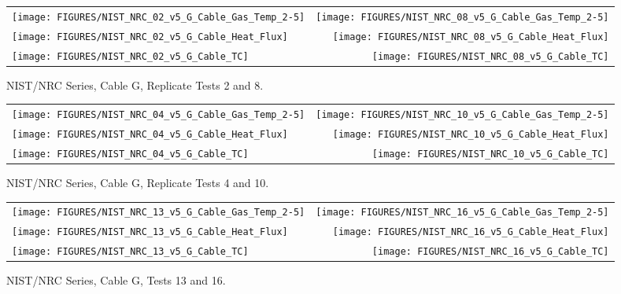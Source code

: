 \begin{figure}[h]
\begin{tabular*}{\textwidth}{l@{\extracolsep{\fill}}r}
\texttt{[image: FIGURES/NIST\_NRC\_02\_v5\_G\_Cable\_Gas\_Temp\_2-5]} &
\texttt{[image: FIGURES/NIST\_NRC\_08\_v5\_G\_Cable\_Gas\_Temp\_2-5]} \\
\texttt{[image: FIGURES/NIST\_NRC\_02\_v5\_G\_Cable\_Heat\_Flux]} &
\texttt{[image: FIGURES/NIST\_NRC\_08\_v5\_G\_Cable\_Heat\_Flux]} \\
\texttt{[image: FIGURES/NIST\_NRC\_02\_v5\_G\_Cable\_TC]} &
\texttt{[image: FIGURES/NIST\_NRC\_08\_v5\_G\_Cable\_TC]}
\end{tabular*}
\caption{NIST/NRC Series, Cable G, Replicate Tests 2 and 8.}
\label{NIST_NRC_G_2_and_8}
\end{figure}

\begin{figure}[h]
\begin{tabular*}{\textwidth}{l@{\extracolsep{\fill}}r}
\texttt{[image: FIGURES/NIST\_NRC\_04\_v5\_G\_Cable\_Gas\_Temp\_2-5]} &
\texttt{[image: FIGURES/NIST\_NRC\_10\_v5\_G\_Cable\_Gas\_Temp\_2-5]} \\
\texttt{[image: FIGURES/NIST\_NRC\_04\_v5\_G\_Cable\_Heat\_Flux]} &
\texttt{[image: FIGURES/NIST\_NRC\_10\_v5\_G\_Cable\_Heat\_Flux]} \\
\texttt{[image: FIGURES/NIST\_NRC\_04\_v5\_G\_Cable\_TC]} &
\texttt{[image: FIGURES/NIST\_NRC\_10\_v5\_G\_Cable\_TC]}
\end{tabular*}
\caption{NIST/NRC Series, Cable G, Replicate Tests 4 and 10.}
\label{NIST_NRC_G_4_and_10}
\end{figure}

\begin{figure}[h]
\begin{tabular*}{\textwidth}{l@{\extracolsep{\fill}}r}
\texttt{[image: FIGURES/NIST\_NRC\_13\_v5\_G\_Cable\_Gas\_Temp\_2-5]} &
\texttt{[image: FIGURES/NIST\_NRC\_16\_v5\_G\_Cable\_Gas\_Temp\_2-5]} \\
\texttt{[image: FIGURES/NIST\_NRC\_13\_v5\_G\_Cable\_Heat\_Flux]} &
\texttt{[image: FIGURES/NIST\_NRC\_16\_v5\_G\_Cable\_Heat\_Flux]} \\
\texttt{[image: FIGURES/NIST\_NRC\_13\_v5\_G\_Cable\_TC]} &
\texttt{[image: FIGURES/NIST\_NRC\_16\_v5\_G\_Cable\_TC]}
\end{tabular*}
\caption{NIST/NRC Series, Cable G, Tests 13 and 16.}
\label{NIST_NRC_G_13_and_16}
\end{figure}

